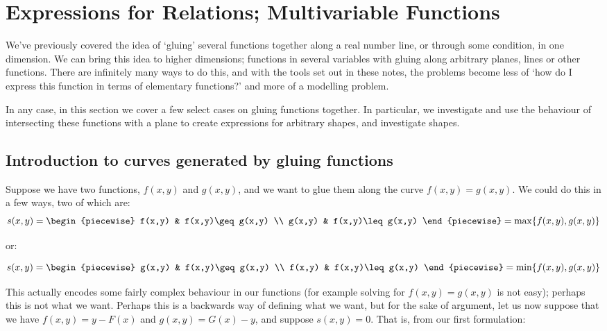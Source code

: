 \chapter{Expressions for Relations; Multivariable Functions}
We've previously covered the idea of `gluing' several functions together along a real number line, or through some condition, in one dimension. We can bring this idea to higher dimensions; functions in several variables with gluing along arbitrary planes, lines or other functions. There are infinitely many ways to do this, and with the tools set out in these notes, the problems become less of `how do I express this function in terms of elementary functions?' and more of a modelling problem.

In any case, in this section we cover a few select cases on gluing functions together. In particular, we investigate and use the behaviour of intersecting these functions with a plane to create expressions for arbitrary shapes, and investigate shapes.

\section{Introduction to curves generated by gluing functions}
Suppose we have two functions, $f(x,y)$ and $g(x,y)$, and we want to glue them along the curve $f(x,y)=g(x,y)$. We could do this in a few ways, two of which are:
$$
    s(x,y)=\begin{piecewise}
        f(x,y) & f(x,y)\geq g(x,y) \\
        g(x,y) & f(x,y)\leq g(x,y)
    \end{piecewise}=\max\br{f(x,y),g(x,y)}
$$

or:

$$
    s(x,y)=\begin{piecewise}
        g(x,y) & f(x,y)\geq g(x,y) \\
        f(x,y) & f(x,y)\leq g(x,y)
    \end{piecewise}=\min\br{f(x,y),g(x,y)}
$$

This actually encodes some fairly complex behaviour in our functions (for example solving for $f(x,y)=g(x,y)$ is not easy); perhaps this is not what we want. Perhaps this is a backwards way of defining what we want, but for the sake of argument, let us now suppose that we have $f(x,y)=y-F(x)$ and $g(x,y)=G(x)-y$, and suppose $s(x,y)=0$. That is, from our first formulation:

